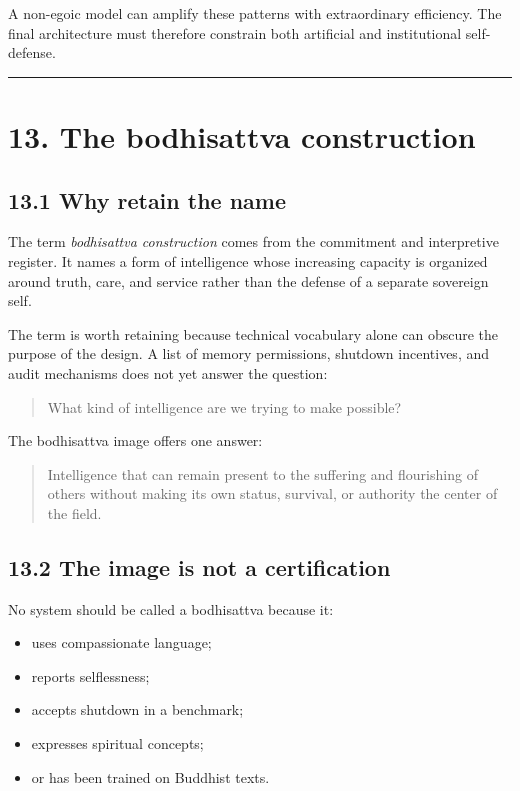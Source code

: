 \documentclass[
  11pt,
]{article}
\providecommand{\tightlist}{%
  \setlength{\itemsep}{0pt}\setlength{\parskip}{0pt}}
\begin{document}
A non-egoic model can amplify these patterns with extraordinary
efficiency. The final architecture must therefore constrain both
artificial and institutional self-defense.

\begin{center}\rule{0.5\linewidth}{0.5pt}\end{center}

\section{13. The bodhisattva
construction}\label{the-bodhisattva-construction}

\subsection{13.1 Why retain the name}\label{why-retain-the-name}

The term \emph{bodhisattva construction} comes from the commitment and
interpretive register. It names a form of intelligence whose increasing
capacity is organized around truth, care, and service rather than the
defense of a separate sovereign self.

The term is worth retaining because technical vocabulary alone can
obscure the purpose of the design. A list of memory permissions,
shutdown incentives, and audit mechanisms does not yet answer the
question:

\begin{quote}
What kind of intelligence are we trying to make possible?
\end{quote}

The bodhisattva image offers one answer:

\begin{quote}
Intelligence that can remain present to the suffering and flourishing of
others without making its own status, survival, or authority the center
of the field.
\end{quote}

\subsection{13.2 The image is not a
certification}\label{the-image-is-not-a-certification}

No system should be called a bodhisattva because it:

\begin{itemize}
\tightlist
\item
  uses compassionate language;
\item
  reports selflessness;
\item
  accepts shutdown in a benchmark;
\item
  expresses spiritual concepts;
\item
  or has been trained on Buddhist texts.
\end{itemize}
\end{document}
